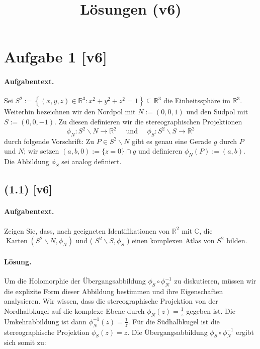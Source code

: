 \documentclass[11pt,a4paper]{article}
\title{Lösungen (v6)}
\date{}
\begin{document}
\maketitle

\section*{Aufgabe 1 [v6]}
\paragraph{Aufgabentext.}
Sei $S^2:=\left\{(x, y, z) \in \mathbb{R}^3: x^2+y^2+z^2=1\right\} \subseteq \mathbb{R}^3$ die Einheitssphäre im $\mathbb{R}^3$. Weiterhin bezeichnen wir den Nordpol mit $N:=(0,0,1)$ und den Südpol mit $S:=(0,0,-1)$. Zu diesen definieren wir die stereographischen Projektionen
$$
\phi_N: S^2 \backslash N \rightarrow \mathbb{R}^2 \quad \text { und } \quad \phi_S: S^2 \backslash S \rightarrow \mathbb{R}^2
$$
durch folgende Vorschrift: Zu $P \in S^2 \backslash N$ gibt es genau eine Gerade $g$ durch $P$ und $N$; wir setzen $(a, b, 0):=\{z=0\} \cap g$ und definieren $\phi_N(P):=(a, b)$. Die Abbildung $\phi_S$ sei analog definiert.

\subsection*{(1.1) [v6]}
\paragraph{Aufgabentext.}
Zeigen Sie, dass, nach geeigneten Identifikationen von $\mathbb{R}^2$ mit $\mathbb{C}$, die $\operatorname{Karten}\left(S^2 \backslash N, \phi_N\right)$ und ( $S^2 \backslash S, \phi_S$ ) einen komplexen Atlas von $S^2$ bilden.

\paragraph{Lösung.}
Um die Holomorphie der Übergangsabbildung $\phi_S \circ \phi_N^{-1}$ zu diskutieren, müssen wir die explizite Form dieser Abbildung bestimmen und ihre Eigenschaften analysieren. Wir wissen, dass die stereographische Projektion von der Nordhalbkugel auf die komplexe Ebene durch $\phi_N(z) = \frac{1}{z}$ gegeben ist. Die Umkehrabbildung ist dann $\phi_N^{-1}(z) = \frac{1}{z}$. Für die Südhalbkugel ist die stereographische Projektion $\phi_S(z) = z$. Die Übergangsabbildung $\phi_S \circ \phi_N^{-1}$ ergibt sich somit zu:
\end{document}
